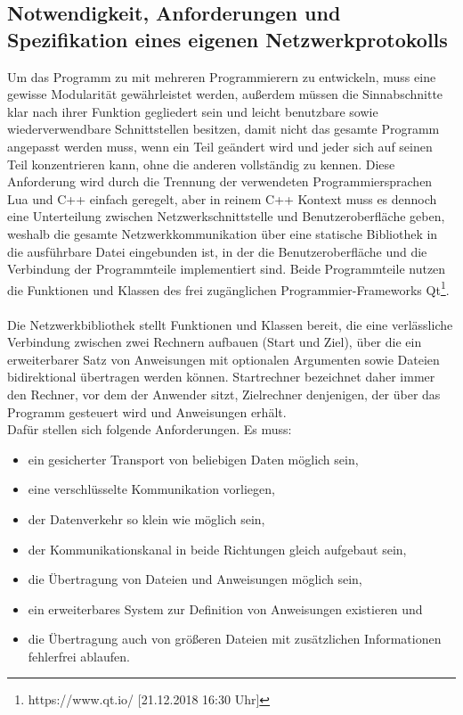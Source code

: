\subsection{Notwendigkeit, Anforderungen und Spezifikation eines eigenen Netzwerkprotokolls}
Um das Programm zu mit mehreren Programmierern zu entwickeln, muss eine gewisse Modularität gewährleistet werden, außerdem müssen die Sinnabschnitte klar nach ihrer Funktion gegliedert sein und leicht benutzbare sowie wiederverwendbare Schnittstellen besitzen, damit nicht das gesamte Programm angepasst werden muss, wenn ein Teil geändert wird und jeder sich auf seinen Teil konzentrieren kann, ohne die anderen vollständig zu kennen.
Diese Anforderung wird durch die Trennung der verwendeten Programmiersprachen Lua und C++ einfach geregelt, aber in reinem C++ Kontext muss es dennoch eine Unterteilung zwischen Netzwerkschnittstelle und Benutzeroberfläche geben, weshalb die gesamte Netzwerkkommunikation über eine statische Bibliothek in die ausführbare Datei eingebunden ist, in der die Benutzeroberfläche und die Verbindung der Programmteile implementiert sind. Beide Programmteile nutzen die Funktionen und Klassen des frei zugänglichen Programmier-Frameworks Qt\footnote{https://www.qt.io/ [21.12.2018 16:30 Uhr]}.\\\\
Die Netzwerkbibliothek stellt Funktionen und Klassen bereit, die eine verlässliche Verbindung zwischen zwei Rechnern aufbauen (Start und Ziel), über die ein erweiterbarer Satz von Anweisungen mit optionalen Argumenten sowie Dateien bidirektional übertragen werden können.
Startrechner bezeichnet daher immer den Rechner, vor dem der Anwender sitzt, Zielrechner denjenigen, der über das Programm gesteuert wird und Anweisungen erhält.\\
Dafür stellen sich folgende Anforderungen. Es muss:\\

\begin{itemize}
\item ein gesicherter Transport von beliebigen Daten möglich sein,
\item eine verschlüsselte Kommunikation vorliegen,
\item der Datenverkehr so klein wie möglich sein,
\item der Kommunikationskanal in beide Richtungen gleich aufgebaut sein,
\item die Übertragung von Dateien und Anweisungen möglich sein,
\item ein erweiterbares System zur Definition von Anweisungen existieren und
\item die Übertragung auch von größeren Dateien mit zusätzlichen Informationen fehlerfrei ablaufen.
\end{itemize}

